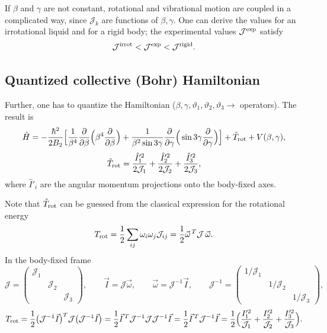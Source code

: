 \documentclass[11pt,a4paper]{article}
\newcommand{\op}[1]{\hat{#1}}
\begin{document}
If $\beta$ and $\gamma$ are not constant, rotational and vibrational motion are coupled in a complicated way, since $\mathcal J_k$ are functions of $\beta,\gamma$. One can derive the values for an irrotational liquid and for a rigid body; the experimental values $\mathcal J^{\rm exp}$ satisfy
\[
\mathcal J^{\rm irrot}<\mathcal J^{\rm exp}<\mathcal J^{\rm rigid}.
\]

\subsection{Quantized collective (Bohr) Hamiltonian}
Further, one has to quantize the Hamiltonian ($\beta,\gamma,\vartheta_1,\vartheta_2,\vartheta_3\to$ operators). The result is
\[
\op H=-\frac{\hbar^2}{2B_2}\Big[\frac{1}{\beta^4}\frac{\partial}{\partial\beta}\Big(\beta^4\frac{\partial}{\partial\beta}\Big)
+\frac{1}{\beta^2\sin3\gamma}\frac{\partial}{\partial\gamma}\Big(\sin3\gamma\frac{\partial}{\partial\gamma}\Big)\Big]
+\op T_{\rm rot}+V(\beta,\gamma),
\]
\[
\op T_{\rm rot}=\frac{\op I'^2_1}{2\mathcal J_1}+\frac{\op I'^2_2}{2\mathcal J_2}+\frac{\op I'^2_3}{2\mathcal J_3},
\]
where $\op I'_i$ are the angular momentum projections onto the body-fixed axes.

Note that $\op T_{\rm rot}$ can be guessed from the classical expression for the rotational energy
\[
T_{\rm rot}=\frac12\sum_{ij}\omega_i\omega_j\mathcal J_{ij}=\frac12\vec\omega^{\,T}\mathcal J\,\vec\omega .
\]
In the body-fixed frame
\[
\mathcal J=\begin{pmatrix}\mathcal J_1&&\\&\mathcal J_2&\\&&\mathcal J_3\end{pmatrix},\qquad
\vec I=\mathcal J\vec\omega,\qquad \vec\omega=\mathcal J^{-1}\vec I,\qquad
\mathcal J^{-1}=\begin{pmatrix}1/\mathcal J_1&&\\&1/\mathcal J_2&\\&&1/\mathcal J_3\end{pmatrix},
\]
\[
T_{\rm rot}=\frac12\big(\mathcal J^{-1}\vec I\big)^T\mathcal J\big(\mathcal J^{-1}\vec I\big)
=\frac12\vec I^{\,T}\mathcal J^{-1}\mathcal J\mathcal J^{-1}\vec I
=\frac12\vec I^{\,T}\mathcal J^{-1}\vec I
=\frac12\Big(\frac{I'^2_1}{\mathcal J_1}+\frac{I'^2_2}{\mathcal J_2}+\frac{I'^2_3}{\mathcal J_3}\Big).
\]
\end{document}
